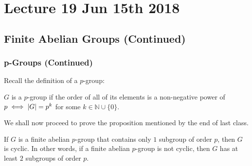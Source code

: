 \chapter{Lecture 19 Jun 15th 2018}%
\label{chp:lecture_19_jun_15th_2018}

\section{Finite Abelian Groups (Continued)}%
\label{sec:finite_abelian_groups_continued}

\subsection{p-Groups (Continued)}%
\label{sub:p_groups_continued}

\begin{note}[Recall]
  Recall the definition of a $p$-group:

  $G$ is a $p$-group if the order of all of its elements is a non-negative power of $p \iff \left|G\right| = p^k$ for some $k \in \mathbb{N} \cup \{0\}$.
\end{note}

We shall now proceed to prove the proposition mentioned by the end of last class.

\begin{propo}
\label{propo:finite_abelian_p_groups_of_order_p_are_cyclic}
  If $G$ is a finite abelian $p$-group that contains only $1$ subgroup of order $p$, then $G$ is cyclic. In other words, if a finite abelian $p$-group is not cyclic, then $G$ has at least $2$ subgroups of order $p$.
\end{propo}

